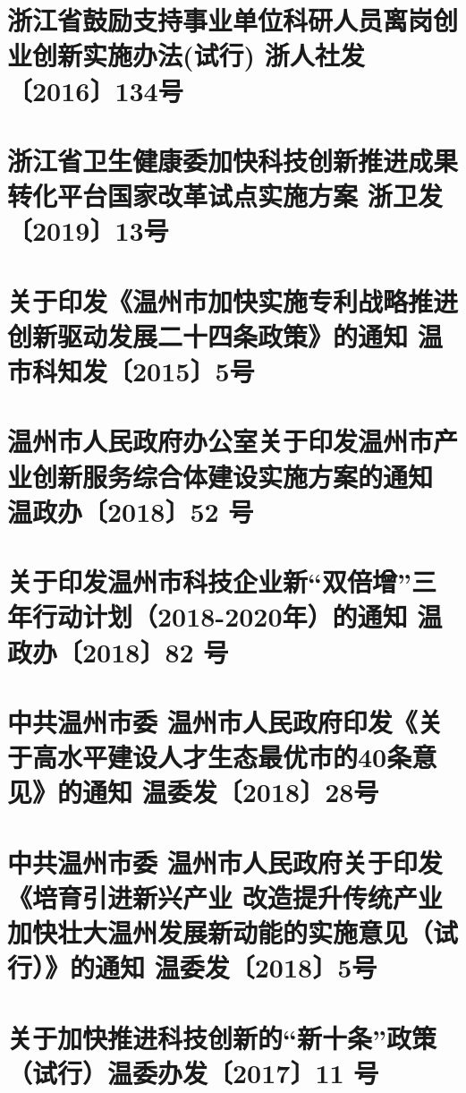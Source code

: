 \documentclass[openany]{book}
\begin{document}
\section{浙江省鼓励支持事业单位科研人员离岗创业创新实施办法(试行)  浙人社发〔2016〕134号}
	

\section{浙江省卫生健康委加快科技创新推进成果转化平台国家改革试点实施方案 浙卫发〔2019〕13号}
	


\section{关于印发《温州市加快实施专利战略推进创新驱动发展二十四条政策》的通知	 温市科知发〔2015〕5号}
	


\section{温州市人民政府办公室关于印发温州市产业创新服务综合体建设实施方案的通知	 温政办〔2018〕52 号}
	


\section{关于印发温州市科技企业新“双倍增”三年行动计划（2018-2020年）的通知 温政办〔2018〕82 号}
	

\section{中共温州市委  温州市人民政府印发《关于高水平建设人才生态最优市的40条意见》的通知 温委发〔2018〕28号}
	

\section{中共温州市委 温州市人民政府关于印发《培育引进新兴产业 改造提升传统产业 加快壮大温州发展新动能的实施意见（试行）》的通知 温委发〔2018〕5号}
	


\section{关于加快推进科技创新的“新十条”政策（试行）温委办发〔2017〕11 号}
	
\end{document}
